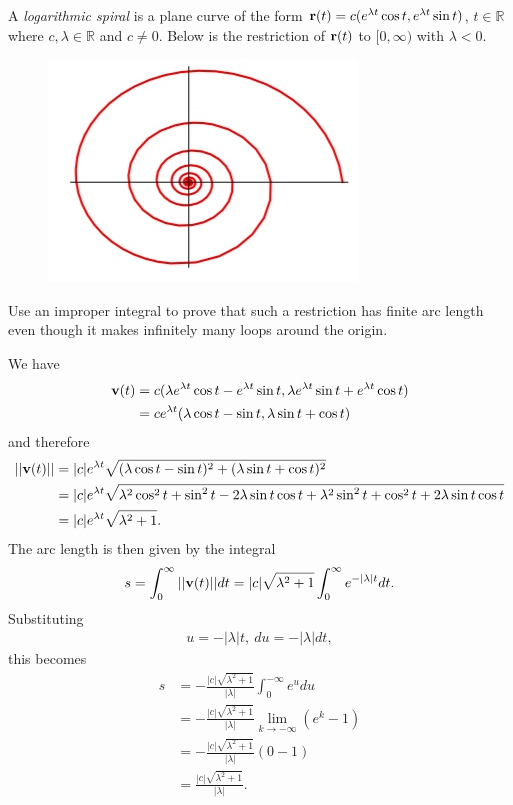 \documentclass[12pt,letterpaper,reqno]{article}
\numberwithin{equation}{section}
\newcommand{\bv}{{\bf v}}
\newcommand{\bbr}{{\bf r}}
\begin{document}
{\begin{exercise}
A \emph{logarithmic spiral} is a plane curve of the form $\bbr(t)=c(e^{\lambda t}\cos t,e^{\lambda t}\sin t)$, $t \in \mathbb{R}$ where $c,\lambda \in \mathbb{R}$ and $c \neq 0$. Below is the restriction of $\bbr(t)$ to $[0,\infty)$ with $\lambda <0$.	

\begin{figure}[h]
	\begin{center}
		\includegraphics[scale=0.5]{figures_mvc/log_spiral}
	\end{center}
\end{figure}
Use an improper integral to prove that such a restriction has finite arc length even though it makes infinitely many loops around the origin.
\end{exercise}

{\color{red}
\begin{solution}
	We have
	\begin{align*}
		\bv(t)&=c(\lambda e^{\lambda t}\cos t-e^{\lambda t}\sin t,\lambda e^{\lambda t}\sin t+e^{\lambda t}\cos t) \\
		&=ce^{\lambda t}(\lambda \cos t-\sin t, \lambda \sin t+\cos t)
	\end{align*}
	and therefore
	\begin{align*}
		||\bv(t)||&=|c|e^{\lambda t}\sqrt{(\lambda \cos t-\sin t)^2+(\lambda \sin t+\cos t)^2} \\
		&=|c|e^{\lambda t}\sqrt{\lambda^2\cos^2 t+\sin^2 t-2\lambda \sin t \cos t+\lambda^2\sin^2 t+ \cos ^2 t+2\lambda \sin t\cos t} \\
		&=|c|e^{\lambda t}\sqrt{\lambda^2+1}.
	\end{align*}
	The arc length is then given by the integral
	\begin{align*}
		s=\int_0^\infty ||\bv(t)||dt=|c|\sqrt{\lambda^2+1}\int_0^\infty e^{-|\lambda|t}dt.
	\end{align*}
	Substituting
	\begin{align*}
		u=-|\lambda|t, \ du=-|\lambda|dt,
	\end{align*}
	this becomes
	\begin{align*}
		s&=-\frac{|c|\sqrt{\lambda^2+1}}{|\lambda|}\int_0^{-\infty}e^{u}du \\
		&=-\frac{|c|\sqrt{\lambda^2+1}}{|\lambda|}\lim_{k \to -\infty}(e^k-1) \\
		&=-\frac{|c|\sqrt{\lambda^2+1}}{|\lambda|}(0-1) \\
		&=\frac{|c|\sqrt{\lambda^2+1}}{|\lambda|}.
	\end{align*}
\end{solution}}

}
\end{document}
